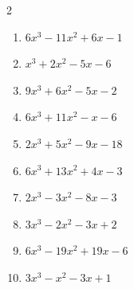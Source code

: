 \begin{multicols}{2}
\begin{enumerate}
  \item $6x^{3}-11x^{2}+6x-1$

        \phantom{$=(2x-1)(3x-1)(x-1)$}

  \item $x^{3}+2x^{2}-5x-6$

        \phantom{$=(x+1)(x+3)(x-2)$}

  \item $9x^{3}+6x^{2}-5x-2$

        \phantom{$=(3x+1)(3x-2)(x+1)$}

  \item $6x^{3}+11x^{2}-x-6$

        \phantom{$=(2x+3)(3x-2)(x+1)$}

  \item $2x^{3}+5x^{2}-9x-18$

        \phantom{$=(2x+3)(x+3)(x-2)$}

\columnbreak %

  \item $6x^{3}+13x^{2}+4x-3$

        \phantom{$=(2x+3)(3x-1)(x+1)$}

  \item $2x^{3}-3x^{2}-8x-3$

        \phantom{$=(2x+1)(x+1)(x-3)$}

  \item $3x^{3}-2x^{2}-3x+2$

        \phantom{$=(3x-2)(x+1)(x-1)$}

  \item $6x^{3}-19x^{2}+19x-6$

        \phantom{$=(2x-3)(3x-2)(x-1)$}

  \item $3x^{3}-x^{2}-3x+1$

        \phantom{$=(3x-1)(x+1)(x-1)$}

\end{enumerate}
\end{multicols}

\newpage
\resetdrill

